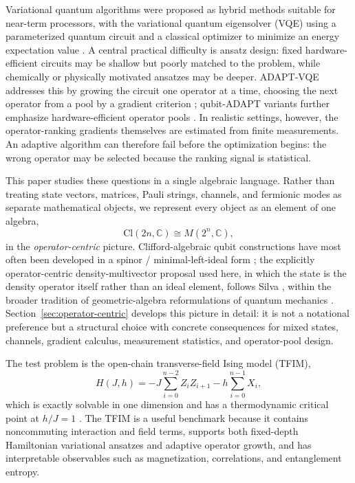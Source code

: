 \documentclass[11pt]{article}
\newcommand{\Cl}{\mathrm{Cl}}
\newcommand{\C}{\mathbb{C}}
\begin{document}
Variational quantum algorithms were proposed as hybrid methods suitable for near-term processors, with the variational quantum eigensolver (VQE) using a parameterized quantum circuit and a classical optimizer to minimize an energy expectation value \cite{peruzzo2014vqe}.  A central practical difficulty is ansatz design: fixed hardware-efficient circuits may be shallow but poorly matched to the problem, while chemically or physically motivated ansatzes may be deeper.  ADAPT-VQE addresses this by growing the circuit one operator at a time, choosing the next operator from a pool by a gradient criterion \cite{grimsley2019adapt}; qubit-ADAPT variants further emphasize hardware-efficient operator pools \cite{tang2021qubitadapt}.  In realistic settings, however, the operator-ranking gradients themselves are estimated from finite measurements.  An adaptive algorithm can therefore fail before the optimization begins: the wrong operator may be selected because the ranking signal is statistical.

This paper studies these questions in a single algebraic language.  Rather than treating state vectors, matrices, Pauli strings, channels, and fermionic modes as separate mathematical objects, we represent every object as an element of one algebra,
\begin{equation}
    \Cl(2n,\C) \cong M(2^n,\C),
\end{equation}
in the \emph{operator-centric} picture.  Clifford-algebraic qubit constructions have most often been developed in a spinor / minimal-left-ideal form \cite{hrdina2022clifford}; the explicitly operator-centric density-multivector proposal used here, in which the state is the density operator itself rather than an ideal element, follows Silva \cite{silva2025operator}, within the broader tradition of geometric-algebra reformulations of quantum mechanics \cite{hestenes2003oersted}.  Section~\ref{sec:operator-centric} develops this picture in detail: it is not a notational preference but a structural choice with concrete consequences for mixed states, channels, gradient calculus, measurement statistics, and operator-pool design.

The test problem is the open-chain transverse-field Ising model (TFIM),
\begin{equation}
    H(J,h) = -J\sum_{i=0}^{n-2} Z_iZ_{i+1} - h\sum_{i=0}^{n-1}X_i,
    \label{eq:tfim}
\end{equation}
which is exactly solvable in one dimension and has a thermodynamic critical point at $h/J=1$ \cite{pfeuty1970ising}.  The TFIM is a useful benchmark because it contains noncommuting interaction and field terms, supports both fixed-depth Hamiltonian variational ansatzes and adaptive operator growth, and has interpretable observables such as magnetization, correlations, and entanglement entropy.
\end{document}
